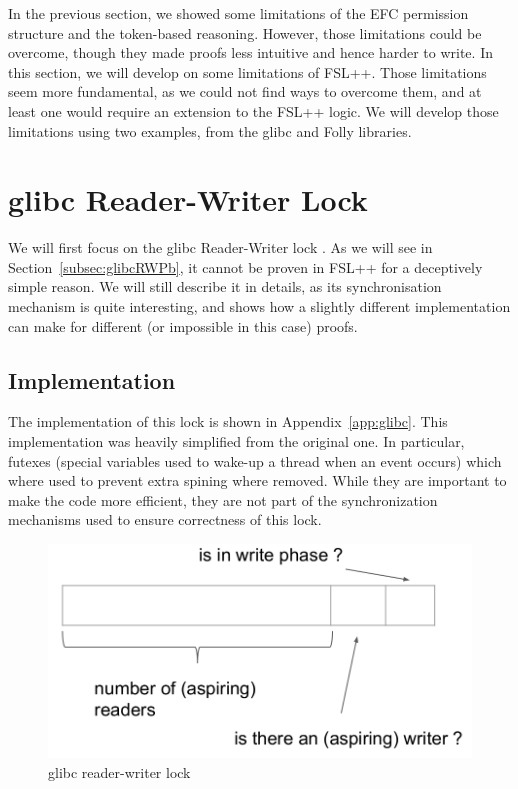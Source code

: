 In the previous section, we showed some limitations of the EFC permission structure and the token-based reasoning. However, those limitations could be overcome, though they made proofs less intuitive and hence harder to write. In this section, we will develop on some limitations of FSL++. Those limitations seem more fundamental, as we could not find ways to overcome them, and at least one would require an extension to the FSL++ logic. We will develop those limitations using two examples, from the glibc and Folly libraries.

\section{glibc Reader-Writer Lock}
We will first focus on the glibc Reader-Writer lock \cite{glibcRW}. As we will see in Section~\ref{subsec:glibcRWPb}, it cannot be proven in FSL++ for a deceptively simple reason. We will still describe it in details, as its synchronisation mechanism is quite interesting, and shows how a slightly different implementation can make for different (or impossible in this case) proofs.

\subsection{Implementation}
The implementation of this lock is shown in Appendix~\ref{app:glibc}. This implementation was heavily simplified from the original one. In particular, futexes (special variables used to wake-up a thread when an event occurs) which where used to prevent extra spining where removed. While they are important to make the code more efficient, they are not part of the synchronization mechanisms used to ensure correctness of this lock.

\begin{figure}
		\begin{center}
		\includegraphics[width=\linewidth]{schemaglibc.png}
		\end{center}
		\caption{glibc reader-writer lock}
		\label{schemaglibc}
\end{figure}

